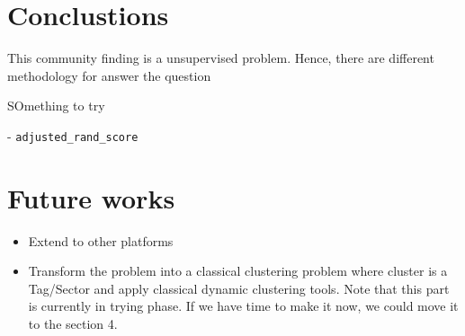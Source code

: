 \section{Conclustions}

This community finding is a unsupervised problem.
Hence, there are different methodology for answer the question


SOmething to try

- \lstinline|adjusted_rand_score|

\section{Future works}

\begin{itemize}
	\item Extend to other platforms
	\item Transform the problem into a classical clustering problem where cluster is a Tag/Sector
	      and apply classical dynamic clustering tools.
	      Note that this part is currently in trying phase.
	      If we have time to make it now, we could move it to the section 4.
\end{itemize}